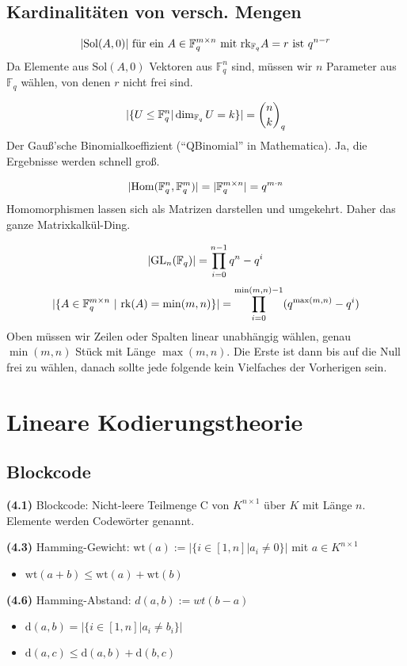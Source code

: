 \documentclass[11pt]{scrartcl}
\newlength{\hangwidth}
\newcommand{\skript}[1]{\settowidth{\hangwidth}{\textbf{(#1)} }\hangpara{\hangwidth}{1}\textbf{(#1)} }
\newcommand{\Sol}{\mathrm{Sol}}
\newcommand{\rk}{\mathrm{rk}}
\newcommand{\GL}{\mathrm{GL}}
\newcommand{\Field}{\mathbb{F}}
\DeclarePairedDelimiter\abs{\lvert}{\rvert}
\begin{document}
\subsection{Kardinalitäten von versch. Mengen}

$$\abs{\Sol(A,0)} \text{ für ein } A \in \Field_q^{m \times n} \text{ mit } \rk_{\Field_q} A = r \text{ ist } q^{n-r}$$
Da Elemente aus $\Sol(A,0)$ Vektoren aus $\Field_q^n$ sind, müssen wir $n$ Parameter aus $\Field_q$ wählen, von denen $r$ nicht frei sind.

$$\abs{\{ U \leq \Field_q^n | \dim_{\Field_q} U = k \}} = \binom{n}{k}_q$$
Der Gauß'sche Binomialkoeffizient (``QBinomial'' in Mathematica). Ja, die Ergebnisse werden schnell groß.

$$\abs{\mathrm{Hom}(\Field_q^n,\Field_q^m)} = \abs{\Field_q^{m \times n}} = q^{m \cdot n}$$
Homomorphismen lassen sich als Matrizen darstellen und umgekehrt. Daher das ganze Matrixkalkül-Ding.

$$\abs{\GL_n(\Field_q)} = \prod_{i=0}^{n-1} q^n-q^i$$
$$\abs{\{A \in \Field_q^{m \times n} ~ | ~ \rk(A) = \min(m,n)\}} = \prod_{i=0}^{\min(m,n)-1} (q^{\max(m,n)}-q^i)$$
Oben müssen wir Zeilen oder Spalten linear unabhängig wählen, genau $\min(m,n)$ Stück mit Länge $\max(m,n)$. Die Erste ist dann bis auf die Null frei zu wählen, danach sollte jede folgende kein Vielfaches der Vorherigen sein.

\section{Lineare Kodierungstheorie}

\subsection{Blockcode}

\skript{4.1}Blockcode: Nicht-leere Teilmenge C von $K^{n \times 1}$ über $K$ mit Länge $n$. Elemente werden Codewörter genannt.

\skript{4.3}Hamming-Gewicht: $\mathrm{wt}(a):=|\{i \in [1,n]|a_i \neq 0\}|$ mit $a \in K^{n \times 1}$
\begin{itemize}
	\item $\mathrm{wt}(a+b) \leq \mathrm{wt}(a)+ \mathrm{wt}(b)$
\end{itemize}

\skript{4.6}Hamming-Abstand: $d(a,b):=wt(b-a)$
\begin{itemize}
	\item $\mathrm{d}(a,b)=|\{i \in [1,n]|a_i \neq b_i\}|$
	\item $\mathrm{d}(a,c) \leq \mathrm{d}(a,b)+\mathrm{d}(b,c)$
\end{itemize}
\end{document}
